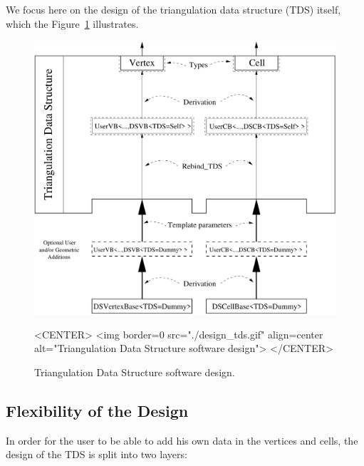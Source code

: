 We focus here on the design of the triangulation data structure (TDS)
itself, which the Figure~\ref{TDS3-fig-layers} illustrates.

\begin{figure}[htbp]
\begin{ccTexOnly}
\begin{center}
\includegraphics[width=14cm]{TriangulationDS_3/design_tds}
\end{center}
\end{ccTexOnly}
\caption{Triangulation Data Structure software design.
\label{TDS3-fig-layers}}
\begin{ccHtmlOnly}
<CENTER>
<img border=0 src="./design_tds.gif" align=center
 alt="Triangulation Data Structure software design">
</CENTER>
\end{ccHtmlOnly}
\end{figure} 

\subsection{Flexibility of the Design}

In order for the user to be able to add his own data in the vertices and cells,
the design of the TDS is split into two layers:

